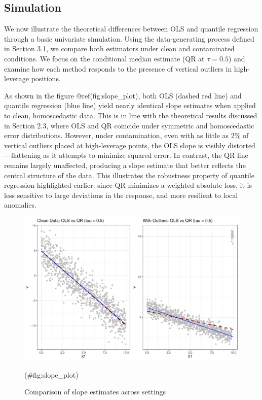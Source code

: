 \documentclass[fleqn,10pt]{latex/stylish_article} %
\begin{document}
\subsection{Simulation}\label{simulation}

We now illustrate the theoretical differences between OLS and quantile regression through a basic univariate simulation. Using the data-generating process defined in Section 3.1, we compare both estimators under clean and contaminated conditions. We focus on the conditional median estimate (QR at \(\tau = 0.5\)) and examine how each method responds to the presence of vertical outliers in high-leverage positions.

As shown in the figure @ref(fig:slope\_plot), both OLS (dashed red line) and quantile regression (blue line) yield nearly identical slope estimates when applied to clean, homoscedastic data. This is in line with the theoretical results discussed in Section 2.3, where OLS and QR coincide under symmetric and homoscedastic error distributions. However, under contamination, even with as little as 2\% of vertical outliers placed at high-leverage points, the OLS slope is visibly distorted---flattening as it attempts to minimize squared error. In contrast, the QR line remains largely unaffected, producing a slope estimate that better reflects the central structure of the data. This illustrates the robustness property of quantile regression highlighted earlier: since QR minimizes a weighted absolute loss, it is less sensitive to large deviations in the response, and more resilient to local anomalies.

\begin{figure}

{\centering \includegraphics[width=0.8\linewidth]{ADR_project_draft_files/figure-latex/slope_plot-1} 

}

\caption{Comparison of slope estimates across settings}(\#fig:slope_plot)
\end{figure}
\end{document}
